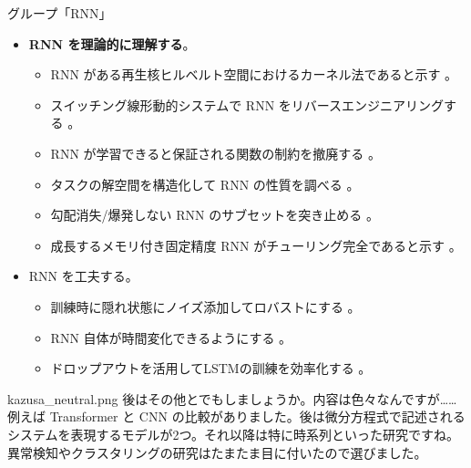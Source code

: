 \documentclass[b5paper,xelatex,ja=standard,10pt]{bxjsarticle}
\begin{document}
\vspace{1pt}
\begin{PROP}[left=0pt]{グループ「RNN」}
\begin{itemize}
  \item \textbf{RNN を理論的に理解する}。
  \begin{itemize}
    \item RNN がある再生核ヒルベルト空間におけるカーネル法であると示す \cite{AdelineFermanian2021}。
    \item スイッチング線形動的システムで RNN をリバースエンジニアリングする \cite{JimmySmith2021}。
    \item RNN が学習できると保証される関数の制約を撤廃する \cite{LifuWang2021} \cite{AbhishekPanigrahi2021}。
    \item タスクの解空間を構造化して RNN の性質を調べる \cite{EliaTurner2021}。
    \item 勾配消失/爆発しない RNN のサブセットを突き止める \cite{ZimingZhang2021}。
    \item 成長するメモリ付き固定精度 RNN がチューリング完全であると示す \cite{StephenChung2021}。
  \end{itemize}
  \vspace{6pt}
  \item RNN を工夫する。
  \begin{itemize}
    \item 訓練時に隠れ状態にノイズ添加してロバストにする \cite{SoonHoeLim2021}。
    \item RNN 自体が時間変化できるようにする \cite{AstonZhang2021}。
    \item ドロップアウトを活用してLSTMの訓練を効率化する \cite{AnupSarma2021}。
  \end{itemize}
\end{itemize}
\end{PROP}
\vspace{1pt}

\begin{SERIFU}[colback=PaleIris, colbacktitle=PaleIris2]{kazusa_neutral.png}
後はその他とでもしましょうか。内容は色々なんですが……例えば Transformer と CNN の比較がありました。後は微分方程式で記述されるシステムを表現するモデルが2つ。それ以降は特に時系列といった研究ですね。異常検知やクラスタリングの研究はたまたま目に付いたので選びました。
\end{SERIFU}
\end{document}
